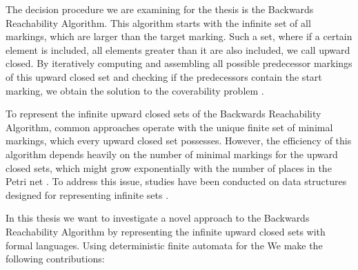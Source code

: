 The decision procedure we are examining for the thesis is the Backwards Reachability Algorithm. This algorithm starts with the infinite set of all markings, which are larger than the target marking. Such a set, where if a certain element is included, all elements greater than it are also included, we call upward closed. By iteratively computing and assembling all possible predecessor markings of this upward closed set and checking if the predecessors contain the start marking, we obtain the solution to the coverability problem \cite{abdulla_96}. 

To represent the infinite upward closed sets of the Backwards Reachability Algorithm, common approaches operate with the unique finite set of minimal markings, which every upward closed set possesses. However, the efficiency of this algorithm depends heavily on the number of minimal markings for the upward closed sets, which might grow exponentially with the number of places in the Petri net \cite{delzanno_00}. To address this issue, studies have been conducted on data structures designed for representing infinite sets \cite{wolper_98, moller_99, delzanno_04}.

%



In this thesis we want to investigate a novel approach to the Backwards Reachability Algorithm by representing the infinite upward closed sets with formal languages. Using deterministic finite automata for the 
We make the following contributions:

